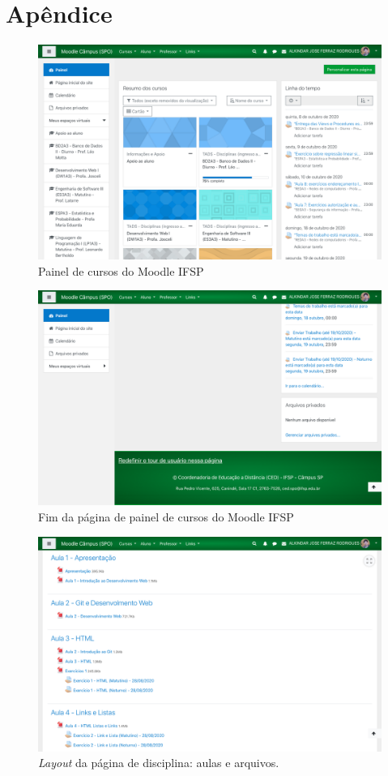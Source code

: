 \documentclass[11pt]{article}
\begin{document}
\section*{Apêndice}
\label{sec:org206f0e1}
\setcounter{figure}{0}
\renewcommand{\figurename}{Fig.}
\begin{figure}[htbp]
\centering
\includegraphics[width=.9\linewidth]{./media/painel.png}
\caption{\label{fig:orgeed86d0}Painel de cursos do Moodle IFSP}
\end{figure}
\begin{figure}[htbp]
\centering
\includegraphics[width=.9\linewidth]{./media/painel_fim.png}
\caption{\label{fig:orgc93e165}Fim da página de painel de cursos do Moodle IFSP}
\end{figure}
\begin{figure}[htbp]
\centering
\includegraphics[width=.9\linewidth]{./media/disc_1.png}
\caption{\label{fig:org5f41d10}\emph{Layout} da página de disciplina: aulas e arquivos.}
\end{figure}
\end{document}
